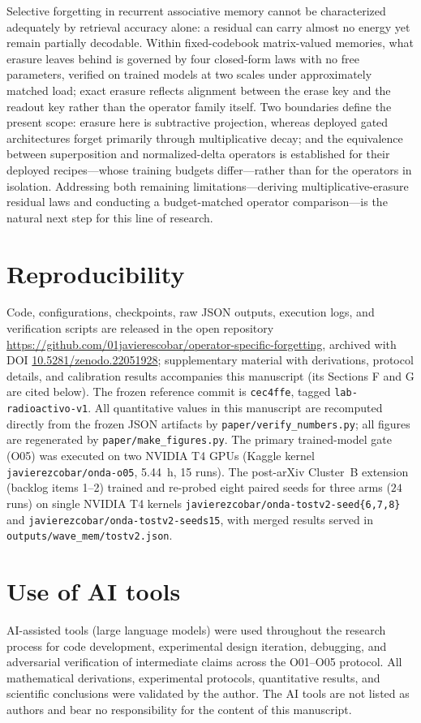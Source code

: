 \documentclass[11pt,a4paper]{article}
\begin{document}
Selective forgetting in recurrent associative memory cannot be characterized adequately by retrieval accuracy alone: a residual can carry almost no energy yet remain partially decodable. Within fixed-codebook matrix-valued memories, what erasure leaves behind is governed by four closed-form laws with no free parameters, verified on trained models at two scales under approximately matched load; exact erasure reflects alignment between the erase key and the readout key rather than the operator family itself. Two boundaries define the present scope: erasure here is subtractive projection, whereas deployed gated architectures forget primarily through multiplicative decay; and the equivalence between superposition and normalized-delta operators is established for their deployed recipes---whose training budgets differ---rather than for the operators in isolation. Addressing both remaining limitations---deriving multiplicative-erasure residual laws and conducting a budget-matched operator comparison---is the natural next step for this line of research.

\section*{Reproducibility}

Code, configurations, checkpoints, raw JSON outputs, execution logs, and verification scripts are released in the open repository \url{https://github.com/01javierescobar/operator-specific-forgetting}, archived with DOI \href{https://doi.org/10.5281/zenodo.22051928}{10.5281/zenodo.22051928}; supplementary material with derivations, protocol details, and calibration results accompanies this manuscript (its Sections F and G are cited below). The frozen reference commit is \texttt{cec4ffe}, tagged \texttt{lab-radioactivo-v1}. All quantitative values in this manuscript are recomputed directly from the frozen JSON artifacts by \texttt{paper/verify\_numbers.py}; all figures are regenerated by \texttt{paper/make\_figures.py}. The primary trained-model gate (O05) was executed on two NVIDIA T4 GPUs (Kaggle kernel \texttt{javierezcobar/onda-o05}, 5.44~h, 15 runs). The post-arXiv Cluster~B extension (backlog items 1--2) trained and re-probed eight paired seeds for three arms ($24$ runs) on single NVIDIA T4 kernels \texttt{javierezcobar/onda-tostv2-seed\{6,7,8\}} and \texttt{javierezcobar/onda-tostv2-seeds15}, with merged results served in \texttt{outputs/wave\_mem/tostv2.json}.

\section*{Use of AI tools}

AI-assisted tools (large language models) were used throughout the research process for code development, experimental design iteration, debugging, and adversarial verification of intermediate claims across the O01--O05 protocol. All mathematical derivations, experimental protocols, quantitative results, and scientific conclusions were validated by the author. The AI tools are not listed as authors and bear no responsibility for the content of this manuscript.



\end{document}
